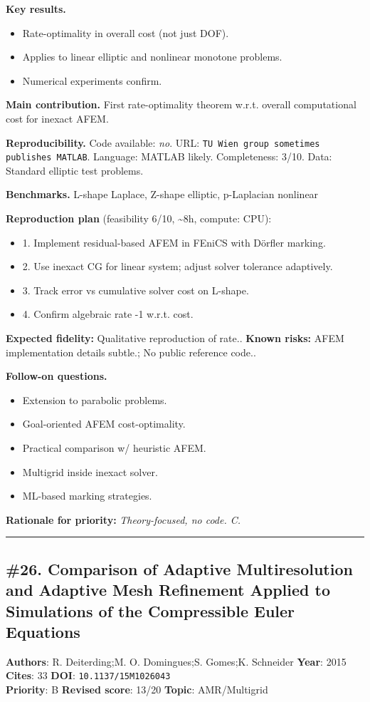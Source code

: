 \documentclass[10pt,letterpaper]{article}
\begin{document}
\textbf{Key results.}
\begin{itemize}
\item Rate-optimality in overall cost (not just DOF).
\item Applies to linear elliptic and nonlinear monotone problems.
\item Numerical experiments confirm.
\end{itemize}

\textbf{Main contribution.} First rate-optimality theorem w.r.t. overall computational cost for inexact AFEM.

\textbf{Reproducibility.} Code available: \emph{no}. URL: \texttt{TU Wien group sometimes publishes MATLAB}. Language: MATLAB likely. Completeness: 3/10. Data: Standard elliptic test problems.

\textbf{Benchmarks.} L-shape Laplace, Z-shape elliptic, p-Laplacian nonlinear

\textbf{Reproduction plan} (feasibility 6/10, \textasciitilde8h, compute: CPU):
\begin{itemize}
\item 1. Implement residual-based AFEM in FEniCS with Dörfler marking.
\item 2. Use inexact CG for linear system; adjust solver tolerance adaptively.
\item 3. Track error vs cumulative solver cost on L-shape.
\item 4. Confirm algebraic rate -1 w.r.t. cost.
\end{itemize}
\textbf{Expected fidelity:} Qualitative reproduction of rate.. \textbf{Known risks:} AFEM implementation details subtle.; No public reference code..

\textbf{Follow-on questions.}
\begin{itemize}
\item Extension to parabolic problems.
\item Goal-oriented AFEM cost-optimality.
\item Practical comparison w/ heuristic AFEM.
\item Multigrid inside inexact solver.
\item ML-based marking strategies.
\end{itemize}

\textbf{Rationale for priority:} \emph{Theory-focused, no code. C.}

\medskip\hrule\medskip

\subsection*{\#26. Comparison of Adaptive Multiresolution and Adaptive Mesh Refinement Applied to Simulations of the Compressible Euler Equations}
\textbf{Authors}: R. Deiterding;M. O. Domingues;S. Gomes;K. Schneider \textbullet{} \textbf{Year}: 2015 \textbullet{} \textbf{Cites}: 33 \textbullet{} \textbf{DOI}: \texttt{10.1137/15M1026043} \\
\textbf{Priority}: B \textbullet{} \textbf{Revised score}: 13/20 \textbullet{} \textbf{Topic}: AMR/Multigrid
\end{document}
